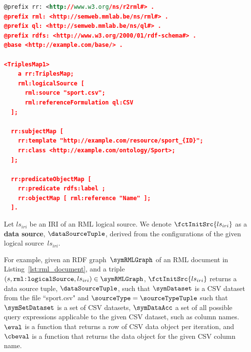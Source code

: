 \begin{lstlisting}[language=rdf, caption={Example RML document, with 1 subject
and 1 predicate-object map, processing data from a CSV file.},
label={lst:rml_document}, float=ht]
@prefix rr: <http://www.w3.org/ns/r2rml#> .
@prefix rml: <http://semweb.mmlab.be/ns/rml#> .
@prefix ql: <http://semweb.mmlab.be/ns/ql#> .
@prefix rdfs: <http://www.w3.org/2000/01/rdf-schema#> .
@base <http://example.com/base/> .

<TriplesMap1>
    a rr:TriplesMap; 
    rml:logicalSource [ 
      rml:source "sport.csv";
      rml:referenceFormulation ql:CSV
  ];

  rr:subjectMap [ 
    rr:template "http://example.com/resource/sport_{ID}";
    rr:class <http://example.com/ontology/Sport>;
  ]; 

  rr:predicateObjectMap [ 
    rr:predicate rdfs:label ; 
    rr:objectMap [ rml:reference "Name" ];
  ]. 
\end{lstlisting}


\begin{definition}
    \label{def:init_data_source}
    Let $ls_{iri}$ be an IRI of an RML logical source. 
    We denote $\fctInitSrc{ls_{iri}}$ as a \textbf{data source}, $\dataSourceTuple$, derived 
    from the configurations of the given logical source~$ls_{iri}$.
\end{definition}
For example, given an RDF graph~$\symRMLGraph$ of an RML document in Listing~\ref{lst:rml_document}, 
and a triple $(s, \texttt{rml:logicalSource}, ls_{iri}) \in \symRMLGraph$, 
$\fctInitSrc{ls_{iri}}$ returns a data source tuple, $\dataSourceTuple$, such 
that $\symDataset$ is a CSV dataset from the file ``sport.csv" and 
$\sourceType =  \sourceTypeTuple$ such that  $\symSetDataset$ is a set of  
CSV datasets, $\symDataAcc$ a set of all possible query expressions applicable to the 
given CSV dataset, such as column names.
$\eval$ is a function that returns a row of CSV data object per
iteration, and $\cbeval$ is a function that returns the data object for the
given CSV column name. 


